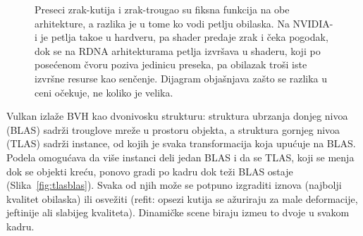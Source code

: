 \begin{figure}[tbp]
\centering
{}
\caption[Gde se nalazi petlja obilaska]{Preseci zrak-kutija i zrak-trougao su fiksna funkcija na obe
arhitekture, a razlika je u tome ko vodi petlju obilaska. Na NVIDIA-i je petlja tako\dj e u hardveru, pa shader
predaje zrak i \v{c}eka pogodak, dok se na RDNA arhitekturama petlja izvr\v{s}ava u shaderu, koji po pose\'cenom \v{c}voru
poziva jedinicu preseka, pa obilazak tro\v{s}i iste izvr\v{s}ne resurse kao sen\v{c}enje. Dijagram obja\v{s}njava
za\v{s}to se razlika u ceni o\v{c}ekuje, ne koliko je velika.}
\label{fig:traversal}
\end{figure}

Vulkan izla\v{z}e BVH kao dvonivosku strukturu: struktura ubrzanja donjeg nivoa (BLAS) sadr\v{z}i trouglove
mre\v{z}e u prostoru objekta, a struktura gornjeg nivoa (TLAS) sadr\v{z}i instance, od kojih je svaka
transformacija koja upu\'cuje na BLAS. Podela omogu\'cava da vi\v{s}e instanci deli jedan BLAS i da se TLAS, koji
se menja dok se objekti kre\'cu, ponovo gradi po kadru dok te\v{z}i BLAS ostaje (Slika~\ref{fig:tlasblas}).
Svaka od njih mo\v{z}e se potpuno izgraditi iznova (najbolji kvalitet obilaska) ili osve\v{z}iti (refit: opsezi
kutija se a\v{z}uriraju za male deformacije, jeftinije ali slabijeg kvaliteta). Dinami\v{c}ke scene biraju
izme\dj u to dvoje u svakom kadru.

